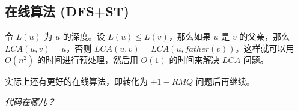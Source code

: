 \subsection{在线算法 (DFS+ST)}
	令 $L(u)$ 为 $u$ 的深度。设 $L(u)\leqslant L(v)$，那么如果 $u$ 是 $v$ 的父亲，那么 $LCA(u,v)=u$，否则 $LCA(u,v)=LCA(u,father(v))$。这样就可以用 $O(n^{2})$ 的时间进行预处理，然后用 $O(1)$ 的时间来解决 $LCA$ 问题。

	实际上还有更好的在线算法，即转化为 $\pm 1-RMQ$ 问题后再继续。
	
	\emph{代码在哪儿？}